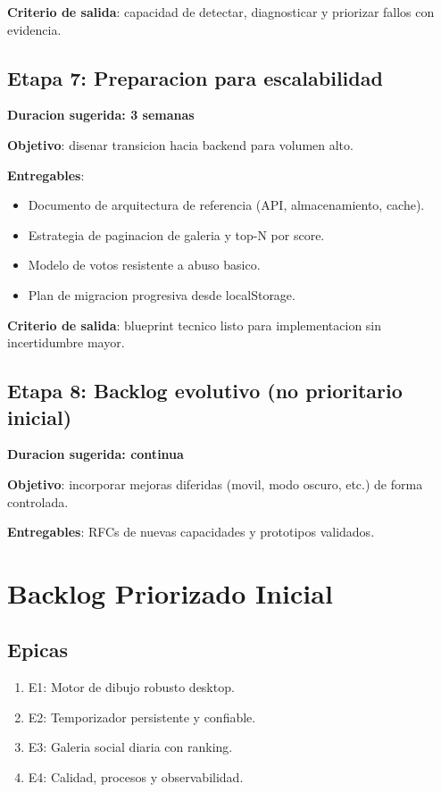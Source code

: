 \documentclass[12pt,a4paper]{article}
\begin{document}
\textbf{Criterio de salida}: capacidad de detectar, diagnosticar y priorizar fallos con evidencia.

\subsection{Etapa 7: Preparacion para escalabilidad}
\textbf{Duracion sugerida: 3 semanas}

\textbf{Objetivo}: disenar transicion hacia backend para volumen alto.

\textbf{Entregables}:
\begin{itemize}
  \item Documento de arquitectura de referencia (API, almacenamiento, cache).
  \item Estrategia de paginacion de galeria y top-N por score.
  \item Modelo de votos resistente a abuso basico.
  \item Plan de migracion progresiva desde localStorage.
\end{itemize}

\textbf{Criterio de salida}: blueprint tecnico listo para implementacion sin incertidumbre mayor.

\subsection{Etapa 8: Backlog evolutivo (no prioritario inicial)}
\textbf{Duracion sugerida: continua}

\textbf{Objetivo}: incorporar mejoras diferidas (movil, modo oscuro, etc.) de forma controlada.

\textbf{Entregables}: RFCs de nuevas capacidades y prototipos validados.

\section{Backlog Priorizado Inicial}
\subsection{Epicas}
\begin{enumerate}
  \item E1: Motor de dibujo robusto desktop.
  \item E2: Temporizador persistente y confiable.
  \item E3: Galeria social diaria con ranking.
  \item E4: Calidad, procesos y observabilidad.
\end{enumerate}
\end{document}
